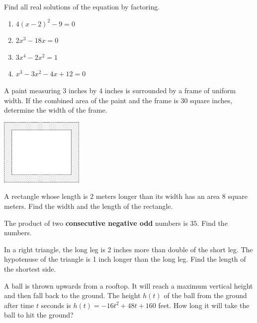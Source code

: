 \documentclass[
  en,11pt]{elegantbook}
\let\BeginKnitrBlock\begin \let\EndKnitrBlock\end
\begin{document}
\BeginKnitrBlock{exercise}
\protect\hypertarget{exr:unnamed-chunk-119}{}{\label{exr:unnamed-chunk-119} }
Find all real solutions of the equation by factoring.

\begin{enumerate}
\def\labelenumi{\arabic{enumi}.}

\item
  \(4(x-2)^2-9=0\)
\item
  \(2x^3-18x=0\)
\item
  \(3x^4-2x^2=1\)
\item
  \(x^3-3x^2-4x+12=0\)
\end{enumerate}
\EndKnitrBlock{exercise}

\BeginKnitrBlock{exercise}
\protect\hypertarget{exr:unnamed-chunk-120}{}{\label{exr:unnamed-chunk-120} }
A paint measuring \(3\) inches by \(4\) inches is surrounded by a frame of uniform width. If the combined area of the paint and the frame is \(30\) square inches, determine the width of the frame.

\includegraphics[width=0.3\textwidth,height=\textheight]{figs/tikz-paint-uniform-width.png}\\
\EndKnitrBlock{exercise}

\BeginKnitrBlock{exercise}
\protect\hypertarget{exr:unnamed-chunk-121}{}{\label{exr:unnamed-chunk-121} }
A rectangle whose length is \(2\) meters longer than its width has an area \(8\) square meters. Find the width and the length of the rectangle.
\EndKnitrBlock{exercise}

\BeginKnitrBlock{exercise}
\protect\hypertarget{exr:unnamed-chunk-122}{}{\label{exr:unnamed-chunk-122} }
The product of two \textbf{consecutive negative odd} numbers is \(35\). Find the numbers.
\EndKnitrBlock{exercise}

\BeginKnitrBlock{exercise}
\protect\hypertarget{exr:unnamed-chunk-123}{}{\label{exr:unnamed-chunk-123} }
In a right triangle, the long leg is 2 inches more than double of the short leg. The hypotenuse of the triangle is 1 inch longer than the long leg. Find the length of the shortest side.
\EndKnitrBlock{exercise}

\BeginKnitrBlock{exercise}
\protect\hypertarget{exr:unnamed-chunk-124}{}{\label{exr:unnamed-chunk-124} }
A ball is thrown upwards from a rooftop. It will reach a maximum vertical height and then fall back to the ground. The height \(h(t)\) of the ball from the ground after time \(t\) seconds is \(h(t)=-16t^2 + 48t + 160\) feet. How long it will take the ball to hit the ground?
\EndKnitrBlock{exercise}
\end{document}
